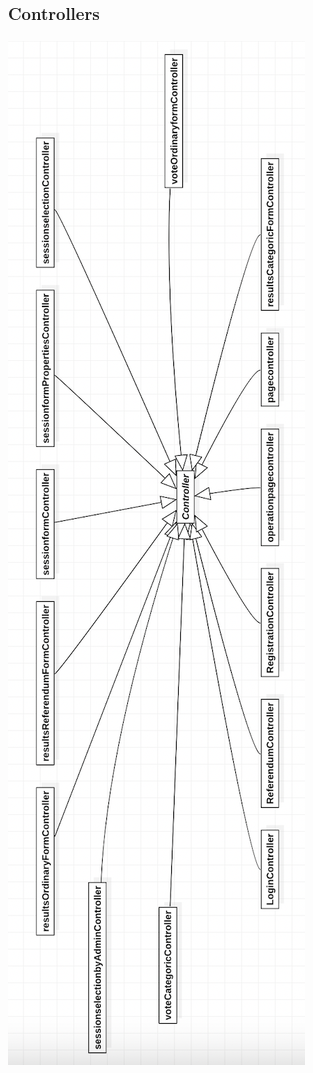 \documentclass[11pt, oneside]{article}   	%
\begin{document}
\subsubsection{Controllers}
\begin{center}
\includegraphics[scale=0.7]{images/class1.png}
\end{center}
\pagebreak
\end{document}
